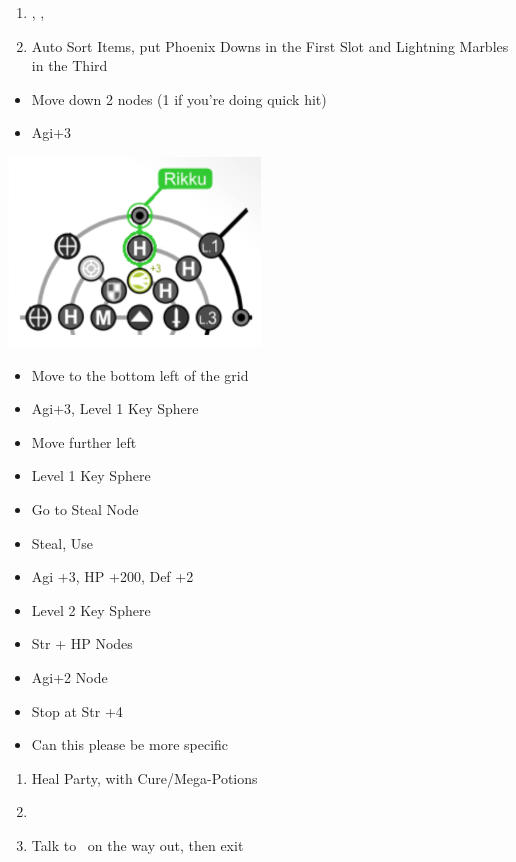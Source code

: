 \begin{enumerate}[resume]
	\item \cs[1:50], \sd, \sd
	\item Auto Sort Items, put Phoenix Downs in the First Slot and Lightning Marbles in the Third
\end{enumerate}
\begin{spheregrid}
\begin{itemize}
	\rikkuf
	\begin{itemize}
		\item Move down 2 nodes (1 if you're doing quick hit)
		\item Agi+3
	\end{itemize}
	\includegraphics{graphics/macalaniarikku}
	\kimahrif
	\begin{itemize}
		\item Move to the bottom left of the grid
		\item Agi+3, Level 1 Key Sphere
		\item Move further left
		\item Level 1 Key Sphere
		\item Go to Steal Node
		\item Steal, Use
	\end{itemize}
	\yunaf
	\begin{itemize}
		\item Agi +3, HP +200, Def +2
		\item Level 2 Key Sphere
		\item Str + HP Nodes
		\item Agi+2 Node
		\item Stop at Str +4
		\item Can this please be more specific
	\end{itemize}
\end{itemize}
\end{spheregrid}
\begin{enumerate}[resume]
	\item Heal Party, with Cure/Mega-Potions
	\item \formation{\tidus}{\lulu}{\kimahri}
	\item Talk to \auron\ on the way out, then exit
\end{enumerate}
